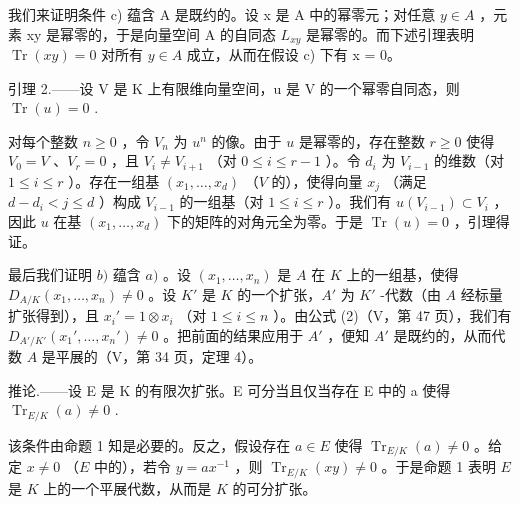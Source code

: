我们来证明条件 c) 蕴含 A 是既约的。设 x 是 A 中的幂零元；对任意 \(y \in A\) ，元素 xy 是幂零的，于是向量空间 A 的自同态 \(L_{xy}\) 是幂零的。而下述引理表明 \(\operatorname{Tr}(xy) = 0\) 对所有 \(y \in A\) 成立，从而在假设 c) 下有 x = 0。

引理 2.——设 V 是 K 上有限维向量空间，u 是 V 的一个幂零自同态，则 \(\operatorname{Tr}(u)=0\) .

对每个整数 \(n \geqslant 0\) ，令 \(V_n\) 为 \(u^n\) 的像。由于 \(u\) 是幂零的，存在整数 \(r \geqslant 0\) 使得 \(V_0 = V\) 、\(V_r = 0\) ，且 \(V_i \neq V_{i+1}\) （对 \(0 \leqslant i \leqslant r-1\) ）。令 \(d_i\) 为 \(V_{i-1}\) 的维数（对 \(1 \leqslant i \leqslant r\) ）。存在一组基 \((x_1, \ldots, x_d)\) （\(V\) 的），使得向量 \(x_j\) （满足 \(d - d_i < j \leqslant d\) ）构成 \(V_{i-1}\) 的一组基（对 \(1 \leqslant i \leqslant r\) ）。我们有 \(u(V_{i-1}) \subset V_i\) ，因此 \(u\) 在基 \((x_1, \ldots, x_d)\) 下的矩阵的对角元全为零。于是 \(\operatorname{Tr}(u) = 0\) ，引理得证。

最后我们证明 \(b)\) 蕴含 \(a)\) 。设 \((x_1, \ldots, x_n)\) 是 \(A\) 在 \(K\) 上的一组基，使得 \(D_{A/K}(x_1, \ldots, x_n) \neq 0\) 。设 \(K'\) 是 \(K\) 的一个扩张，\(A'\) 为 \(K'\) -代数（由 \(A\) 经标量扩张得到），且 \(x_i' = 1 \otimes x_i\) （对 \(1 \leqslant i \leqslant n\) ）。由公式 (2)（V，第 47 页），我们有 \(D_{A'/K'}(x_1', \ldots, x_n') \neq 0\) 。把前面的结果应用于 \(A'\) ，便知 \(A'\) 是既约的，从而代数 \(A\) 是平展的（V，第 34 页，定理 4）。

推论.——设 E 是 K 的有限次扩张。E 可分当且仅当存在 E 中的 a 使得 \(\operatorname{Tr}_{E/K}(a) \neq 0\) .

该条件由命题 1 知是必要的。反之，假设存在 \(a \in E\) 使得 \(\operatorname{Tr}_{E/K}(a) \neq 0\) 。给定 \(x \neq 0\) （\(E\) 中的），若令 \(y = ax^{-1}\) ，则 \(\operatorname{Tr}_{E/K}(xy) \neq 0\) 。于是命题 1 表明 \(E\) 是 \(K\) 上的一个平展代数，从而是 \(K\) 的可分扩张。

